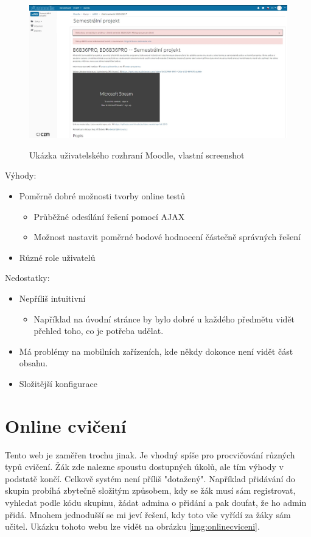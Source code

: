 \begin{figure}[H]
    \caption{Ukázka uživatelského rozhraní Moodle, vlastní screenshot}
    \centering
    \includegraphics[width=\textwidth]{images/moodle}
    \label{img:moodle}
\end{figure}

Výhody:
\begin{itemize}
  \item Poměrně dobré možnosti tvorby online testů
  \begin{itemize}
    \item Průběžné odesílání řešení pomocí AJAX
    \item Možnost nastavit poměrné bodové hodnocení částečně správných řešení
  \end{itemize}
  \item Různé role uživatelů
\end{itemize}

Nedostatky:
\begin{itemize}
  \item Nepříliš intuitivní
  \begin{itemize}
      \item Například na úvodní stránce by bylo dobré u každého předmětu vidět přehled toho, co je potřeba udělat.
  \end{itemize}
  \item Má problémy na mobilních zařízeních, kde někdy dokonce není vidět část obsahu.
  \item Složitější konfigurace
\end{itemize}

\section{Online cvičení}

Tento web je zaměřen trochu jinak. Je vhodný spíše pro procvičování různých typů cvičení. Žák zde nalezne spoustu dostupných úkolů, ale tím výhody v podstatě končí. Celkově systém není příliš "dotažený". Například přidávání do skupin probíhá zbytečně složitým způsobem, kdy se žák musí sám registrovat, vyhledat podle kódu skupinu, žádat admina o přidání a pak doufat, že ho admin přidá. Mnohem jednodušší se mi jeví řešení, kdy toto vše vyřídí za žáky sám učitel. Ukázku tohoto webu lze vidět na obrázku \ref{img:onlinecviceni}.


